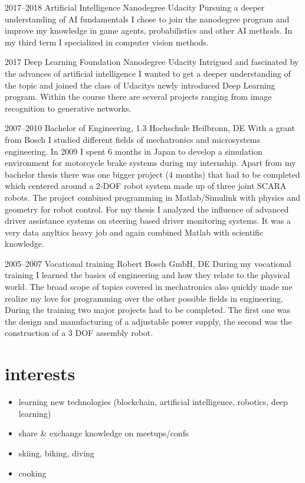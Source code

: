 \documentclass[]{friggeri-cv} %
\begin{document}
\begin{entrylist}

\entry
{2017--2018}
{Artificial Intelligence {\normalfont Nanodegree}}
{Udacity}
{Pursuing a deeper understanding of AI fundamentals I chose to join the nanodegree program and improve my knowledge in game agents, probabilistics and other AI methods. In my third term I specialized in computer vision methods.}

\entry
{2017}
{Deep Learning {\normalfont Foundation Nanodegree}}
{Udacity}
{Intrigued and fascinated by the advances of artificial intelligence I wanted to get a deeper understanding of the topic and joined the class of Udacitys newly introduced Deep Learning program. Within the course there are several projects ranging from image recognition to generative networks.}

\entry
{2007--2010}
{Bachelor {\normalfont of Engineering}, 1.3}
{Hochschule Heilbronn, DE}
{With a grant from Bosch I studied different fields of mechatronics and microsystems engineering. In 2009 I spent 6 months in Japan to develop a simulation environment for motorcycle brake systems during my internship. Apart from my bachelor thesis there was one bigger project (4 months) that had to be completed which centered around a 2-DOF robot system made up of three joint SCARA robots. The project combined programming in Matlab/Simulink with physics and geometry for robot control. 
For my thesis I analyzed the influence of advanced driver assistance systems on steering based driver monitoring systems. It was a very data anyltics heavy job and again combined Matlab with scientific knowledge.
}

\entry
{2005--2007}
{Vocational training}
{Robert Bosch GmbH, DE}
{During my vocational training I learned the basics of engineering and how they relate to the physical world. The broad scope of topics covered in mechatronics also quickly made me realize my love for programming over the other possible fields in engineering. During the training two major projects had to be completed. The first one was the design and manufacturing of a adjustable power supply, the second was the construction of a 3 DOF assembly robot.
}
\end{entrylist}


\section{\color{green}interests}
\begin{itemize}
\item learning new technologies (blockchain, artificial intelligence, robotics, deep learning)
\item share \& exchange knowledge on meetups/confs
\item skiing, biking, diving
\item cooking
\end{itemize}

\end{document}
